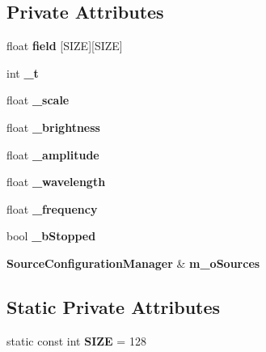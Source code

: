 \subsection*{Private Attributes}
\begin{DoxyCompactItemize}
\item 
float {\bfseries field} [S\-I\-Z\-E][S\-I\-Z\-E]\label{classSoundfieldViewer_1_1WaveField2D_a572b151e68ab02b212371400b1eda9eb}

\item 
int {\bfseries \-\_\-t}\label{classSoundfieldViewer_1_1WaveField2D_ac5b3e24de3149d58164fa8167c6a073a}

\item 
float {\bfseries \-\_\-scale}\label{classSoundfieldViewer_1_1WaveField2D_a4ff2a3b715507c2e1161771b1ae674ad}

\item 
float {\bfseries \-\_\-brightness}\label{classSoundfieldViewer_1_1WaveField2D_a173ffe4b4c81bb7e9abe63ed733aad0f}

\item 
float {\bfseries \-\_\-amplitude}\label{classSoundfieldViewer_1_1WaveField2D_a520e825614562e17ff3cdffa16fad069}

\item 
float {\bfseries \-\_\-wavelength}\label{classSoundfieldViewer_1_1WaveField2D_ac8e7c1db3cbce8e9695f55d79988c24e}

\item 
float {\bfseries \-\_\-frequency}\label{classSoundfieldViewer_1_1WaveField2D_a826cc77a1b2468c31646f51c709035fd}

\item 
bool {\bfseries \-\_\-b\-Stopped}\label{classSoundfieldViewer_1_1WaveField2D_a9be31e29fbee824480ac2fc753d7bc70}

\item 
{\bf Source\-Configuration\-Manager} \& {\bfseries m\-\_\-o\-Sources}\label{classSoundfieldViewer_1_1WaveField2D_a9f75e90352f0f527c8c881a852a4fb12}

\end{DoxyCompactItemize}
\subsection*{Static Private Attributes}
\begin{DoxyCompactItemize}
\item 
static const int {\bfseries S\-I\-Z\-E} = 128\label{classSoundfieldViewer_1_1WaveField2D_a4282a495fd393a5950973afba9eb0dc0}

\end{DoxyCompactItemize}

